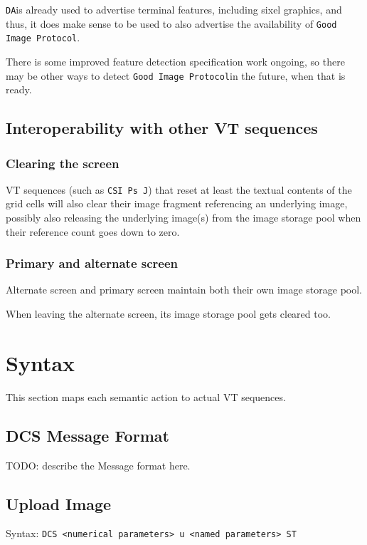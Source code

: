 \documentclass{article}
\newcommand{\code}[1]{\colorbox{light-gray}{\texttt{#1}}}
\newcommand{\DA}{\code{DA}}
\newcommand{\GoodImageProtocol}{\code{Good Image Protocol}}
\begin{document}
\DA is already used to advertise terminal features, including sixel graphics, and thus,
it does make sense to be used to also advertise the availability of \GoodImageProtocol.

There is some improved feature detection specification work ongoing,
so there may be other ways to detect \GoodImageProtocol in the future, when that is ready.

\subsection{Interoperability with other VT sequences}

\subsubsection*{Clearing the screen}

VT sequences (such as \code{CSI Ps J}) that reset at least the textual contents of the grid cells will also
clear their image fragment referencing an underlying image, possibly also releasing the
underlying image(s) from the image storage pool when their reference count goes down to zero.

\subsubsection*{Primary and alternate screen}

Alternate screen and primary screen maintain both their own image storage pool.

When leaving the alternate screen, its image storage pool gets cleared too.
\section{Syntax} %

This section maps each semantic action to actual VT sequences.

\subsection{DCS Message Format}

TODO: describe the Message format here.

\subsection{Upload Image}

Syntax: \code{DCS <numerical parameters> u <named parameters> ST}
\end{document}
